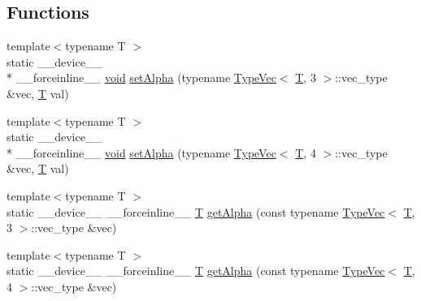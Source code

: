 \subsection*{Functions}
\begin{DoxyCompactItemize}
\item 
{\footnotesize template$<$typename T $>$ }\\static \-\_\-\-\_\-device\-\_\-\-\_\- \\*
\-\_\-\-\_\-forceinline\-\_\-\-\_\- \hyperlink{legacy_8hpp_a8bb47f092d473522721002c86c13b94e}{void} \hyperlink{namespacecv_1_1gpu_1_1device_1_1color__detail_acb9d96dfb22d9acc884180ee4ee8dd65}{set\-Alpha} (typename \hyperlink{structcv_1_1gpu_1_1device_1_1TypeVec}{Type\-Vec}$<$ \hyperlink{calib3d_8hpp_a3efb9551a871ddd0463079a808916717}{T}, 3 $>$\-::vec\-\_\-type \&vec, \hyperlink{calib3d_8hpp_a3efb9551a871ddd0463079a808916717}{T} val)
\item 
{\footnotesize template$<$typename T $>$ }\\static \-\_\-\-\_\-device\-\_\-\-\_\- \\*
\-\_\-\-\_\-forceinline\-\_\-\-\_\- \hyperlink{legacy_8hpp_a8bb47f092d473522721002c86c13b94e}{void} \hyperlink{namespacecv_1_1gpu_1_1device_1_1color__detail_af3e29e3aae541416410023e94055468d}{set\-Alpha} (typename \hyperlink{structcv_1_1gpu_1_1device_1_1TypeVec}{Type\-Vec}$<$ \hyperlink{calib3d_8hpp_a3efb9551a871ddd0463079a808916717}{T}, 4 $>$\-::vec\-\_\-type \&vec, \hyperlink{calib3d_8hpp_a3efb9551a871ddd0463079a808916717}{T} val)
\item 
{\footnotesize template$<$typename T $>$ }\\static \-\_\-\-\_\-device\-\_\-\-\_\- \-\_\-\-\_\-forceinline\-\_\-\-\_\- \hyperlink{calib3d_8hpp_a3efb9551a871ddd0463079a808916717}{T} \hyperlink{namespacecv_1_1gpu_1_1device_1_1color__detail_a6a2dae8f593965d0cae8c83e5b26a0c5}{get\-Alpha} (const typename \hyperlink{structcv_1_1gpu_1_1device_1_1TypeVec}{Type\-Vec}$<$ \hyperlink{calib3d_8hpp_a3efb9551a871ddd0463079a808916717}{T}, 3 $>$\-::vec\-\_\-type \&vec)
\item 
{\footnotesize template$<$typename T $>$ }\\static \-\_\-\-\_\-device\-\_\-\-\_\- \-\_\-\-\_\-forceinline\-\_\-\-\_\- \hyperlink{calib3d_8hpp_a3efb9551a871ddd0463079a808916717}{T} \hyperlink{namespacecv_1_1gpu_1_1device_1_1color__detail_a00b4a8e66a664baa04b2cb0d2d674cd2}{get\-Alpha} (const typename \hyperlink{structcv_1_1gpu_1_1device_1_1TypeVec}{Type\-Vec}$<$ \hyperlink{calib3d_8hpp_a3efb9551a871ddd0463079a808916717}{T}, 4 $>$\-::vec\-\_\-type \&vec)

\end{DoxyCompactItemize}
